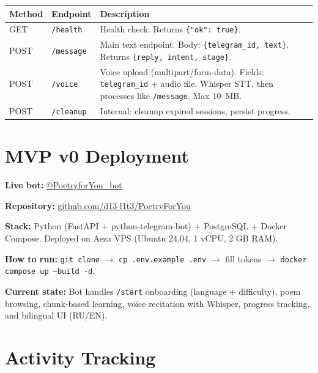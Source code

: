 \documentclass[11pt, a4paper]{article}
\begin{document}
\begin{center}
\footnotesize
\begin{tabularx}{\textwidth}{l|l|X}
\toprule
\textbf{Method} & \textbf{Endpoint} & \textbf{Description} \\
\midrule
GET & \texttt{/health} & Health check. Returns \texttt{\{"ok": true\}}. \\
POST & \texttt{/message} & Main text endpoint. Body: \texttt{\{telegram\_id, text\}}. Returns \texttt{\{reply, intent, stage\}}. \\
POST & \texttt{/voice} & Voice upload (multipart/form-data). Fields: \texttt{telegram\_id} + audio file. Whisper STT, then processes like \texttt{/message}. Max 10~MB. \\
POST & \texttt{/cleanup} & Internal: cleanup expired sessions, persist progress. \\
\bottomrule
\end{tabularx}
\end{center}


\section{MVP v0 Deployment}

\textbf{Live bot:} \href{https://t.me/PoetryforYou_bot}{@PoetryforYou\_bot}

\textbf{Repository:} \href{https://github.com/d13-l1t3/PoetryForYou}{github.com/d13-l1t3/PoetryForYou}

\textbf{Stack:} Python (FastAPI + python-telegram-bot) + PostgreSQL + Docker Compose. Deployed on Aeza VPS (Ubuntu 24.04, 1 vCPU, 2 GB RAM).

\textbf{How to run:} \texttt{git clone} $\rightarrow$ \texttt{cp .env.example .env} $\rightarrow$ fill tokens $\rightarrow$ \texttt{docker compose up --build -d}.

\textbf{Current state:} Bot handles \texttt{/start} onboarding (language + difficulty), poem browsing, chunk-based learning, voice recitation with Whisper, progress tracking, and bilingual UI (RU/EN).


\section{Activity Tracking}
\end{document}
